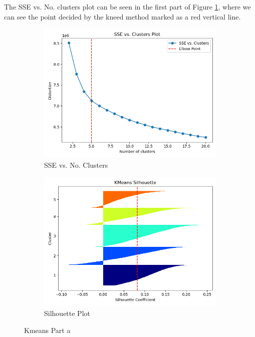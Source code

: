 \documentclass[12pt]{article}
\begin{document}
The SSE vs. No. clusters plot can be seen in the first part of Figure \ref{figure1}, where we can see the point decided 
by the kneed method marked as a red vertical line.
\begin{figure}
    \begin{subfigure}{.5\textwidth}
        \includegraphics[width=.95\textwidth]{../results/kmeans/SSE_Cluster_Plot.png}
        \caption{SSE vs. No. Clusters}
        \end{subfigure}%
      \begin{subfigure}{.5\textwidth}
        \includegraphics[width=.95\textwidth]{../results/kmeans/Silhouette_Plot.png}
        \caption{Silhouette Plot}
      \end{subfigure}
      \caption{Kmeans Part a}
      \label{figure1}
\end{figure}
\end{document}

